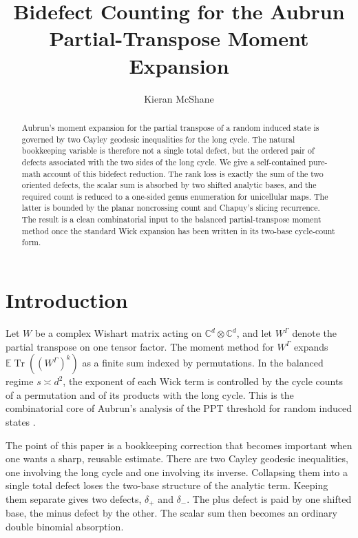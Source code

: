 \documentclass[11pt]{article}
\title{Bidefect Counting for the Aubrun Partial-Transpose Moment Expansion}
\author{Kieran McShane}
\date{}
\numberwithin{equation}{section}
\newcommand{\C}{\mathbb C}
\newcommand{\tr}{\operatorname{Tr}}
\newcommand{\ddp}{\delta_{+}}
\newcommand{\ddm}{\delta_{-}}
\newcommand{\Wish}{W}
\newcommand{\PT}{\Gamma}
\begin{document}
\maketitle

\begin{abstract}
Aubrun's moment expansion for the partial transpose of a random induced
state is governed by two Cayley geodesic inequalities for the long cycle.
The natural bookkeeping variable is therefore not a single total defect, but
the ordered pair of defects associated with the two sides of the long cycle.
We give a self-contained pure-math account of this bidefect reduction.  The
rank loss is exactly the sum of the two oriented defects, the scalar sum is
absorbed by two shifted analytic bases, and the required count is reduced to a
one-sided genus enumeration for unicellular maps.  The latter is bounded by
the planar noncrossing count and Chapuy's slicing recurrence.  The result is a
clean combinatorial input to the balanced partial-transpose moment method once
the standard Wick expansion has been written in its two-base cycle-count form.
\end{abstract}

\tableofcontents

\section{Introduction}

Let \(\Wish\) be a complex Wishart matrix acting on
\(\C^d\otimes\C^d\), and let \(\Wish^\PT\) denote the partial transpose on
one tensor factor.  The moment method for \(\Wish^\PT\) expands
\(\mathbb E\tr((\Wish^\PT)^k)\) as a finite sum indexed by permutations.
In the balanced regime \(s\asymp d^2\), the exponent of each Wick term is
controlled by the cycle counts of a permutation and of its products with the
long cycle.  This is the combinatorial core of Aubrun's analysis of the
PPT threshold for random induced states
\cite{aubrun_partial_2012,aubrun_entanglement_2014}.

The point of this paper is a bookkeeping correction that becomes important
when one wants a sharp, reusable estimate.  There are two Cayley geodesic
inequalities, one involving the long cycle and one involving its inverse.
Collapsing them into a single total defect loses the two-base structure of
the analytic term.  Keeping them separate gives two defects, \(\ddp\) and
\(\ddm\).  The plus defect is paid by one shifted base, the minus defect by
the other.  The scalar sum then becomes an ordinary double binomial
absorption.
\end{document}
